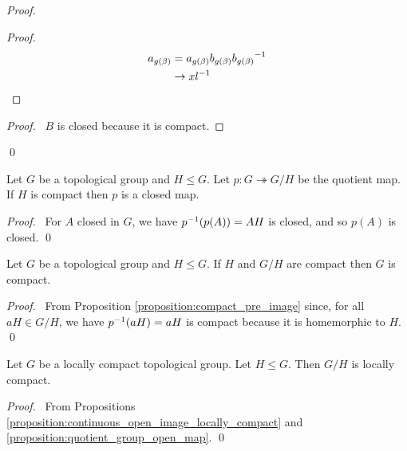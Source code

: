 \begin{proof}
    \pf
    \begin{proof}
        \pf
        \begin{align*}
            a_{g(\beta)} & = a_{g(\beta)} b_{g(\beta)} {b_{g(\beta)}}^{-1} \\
            & \rightarrow x {l}^{-1}
        \end{align*}
    \end{proof}
    \begin{proof}
        \pf\ $B$ is closed because it is compact.
    \end{proof}
    \qed
\end{proof}
\begin{corollary}
    Let $G$ be a topological group and $H \leq G$. Let $p : G \twoheadrightarrow G / H$ be the quotient map.
    If $H$ is compact then $p$ is a closed map.
\end{corollary}

\begin{proof}
    \pf\ For $A$ closed in $G$, we have ${p}^{-1}(p(A)) = AH$ is closed, and so
    $p(A)$ is closed. \qed
\end{proof}

\begin{corollary}
    Let $G$ be a topological group and $H \leq G$. If $H$ and $G / H$ are compact then $G$ is compact.
\end{corollary}

\begin{proof}
    \pf\ From Proposition \ref{proposition:compact_pre_image} since, for all $aH \in G / H$,
    we have ${p}^{-1}(aH) = aH$ is compact because it is homemorphic to $H$. \qed
\end{proof}

\begin{proposition}
    Let $G$ be a locally compact topological group. Let $H \leq G$. Then $G/H$ is locally compact.
\end{proposition}

\begin{proof}
    \pf\ From Propositions \ref{proposition:continuous_open_image_locally_compact}
    and \ref{proposition:quotient_group_open_map}. \qed
\end{proof}

